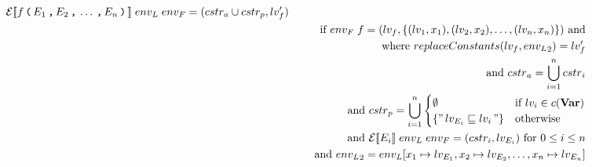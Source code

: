 \begin{align*}
& \mathcal{E}[\![ f \, \texttt{(} \, E_1 \, \texttt{,} \, E_2 \, \texttt{,} \, \dots \, \texttt{,} \, E_n \, \texttt{)} \, ]\!] \; {env_L} \; {env_F} = (cstr_a \cup cstr_p, lv_f') \\
& & \quad \text{ if } {env_F} \; f = (lv_f, \{(lv_1, x_1), (lv_2, x_2), \dots, (lv_n, x_n)\}) \text{ and} \\
& & \quad \text{ where } replaceConstants(lv_f, {env_L}_2) = lv_f' \\
& & \quad \text{ and } {cstr}_a = \bigcup\limits_{i=1}^n {cstr}_i \\
& & \quad \text{ and } {cstr}_p = \bigcup\limits_{i=1}^n
  \begin{cases}
    \emptyset &\text{if } lv_i \in c(\mathbf{Var})\\
    \{ "\,lv_{E_i} \sqsubseteq lv_i\," \} & \text{otherwise}
  \end{cases} \\
& & \quad \text{ and } \mathcal{E}[\![ E_i ]\!] \; {env_L} \; {env_F} = (cstr_i, lv_{E_i}) \text{ for } 0 \leq i \leq n \\
& & \quad \text{ and } {env_L}_2 = {env_L}[x_1 \mapsto lv_{E_1}, x_2 \mapsto lv_{E_2}, \dots, x_n \mapsto lv_{E_n}]
\end{align*}
